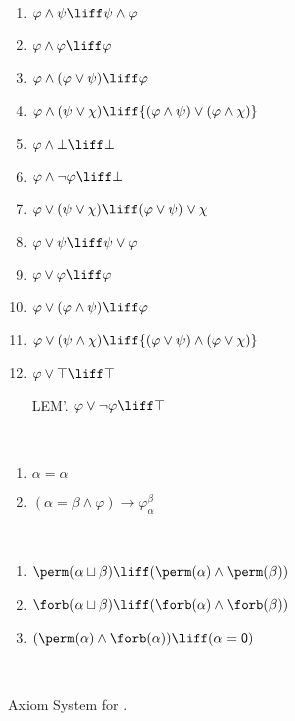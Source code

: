 \begin{figure}
{\begin{minipage}{0.95\textwidth}
\begin{multicols}{2}
\begin{enumerate}[label=A\arabic*'.]
		\item $\varphi \wedge \psi \liff \psi \wedge \varphi$
		\item $\varphi \wedge \varphi \liff \varphi$
		\item $\varphi \wedge (\varphi \vee \psi) \liff \varphi$
		\item ${\varphi \wedge (\psi \vee \chi)} \liff {(\varphi \wedge \psi) \vee (\varphi \wedge \chi)}$
		\item $\varphi \wedge \bot \liff \bot$
		\item $\varphi \wedge \neg \varphi \liff \bot$
		\item $\varphi \vee (\psi \vee \chi) \liff (\varphi \vee \psi) \vee \chi$
		\item $\varphi \vee \psi \liff \psi \vee \varphi$
		\item $\varphi \vee \varphi \liff \varphi$
		\item $\varphi \vee (\varphi \wedge \psi) \liff \varphi$
		\item ${\varphi \vee (\psi \wedge \chi)} \liff {(\varphi \vee \psi) \wedge (\varphi \vee \chi)}$
		\item $\varphi \vee \top \liff \top$
		\item[LEM'.] $\varphi \vee \neg \varphi \liff \top$
	\end{enumerate}
\end{multicols}
		\ \\[-1.5cm]
		\begin{multicols}{2}
			\begin{enumerate}[label=E\arabic*.]
				\item $\alpha = \alpha$
				\item $(\alpha=\beta \land \varphi) \to {\varphi_{\alpha}^{\beta}}$%
			\end{enumerate}
		\end{multicols}
		\ \\[-1.5cm]
		\begin{multicols}{2}
			\begin{enumerate}[label=D\arabic*.]
				\item $\perm(\alpha\sqcup\beta) \liff (\perm(\alpha) \land \perm(\beta))$
				\item $\forb(\alpha\sqcup\beta) \liff (\forb(\alpha) \land \forb(\beta))$
				\item $(\perm(\alpha) \land \forb(\alpha)) \liff (\alpha = \mathsf{0})$
			\end{enumerate}
		\end{multicols}
	\end{minipage}}\\[1em]
	\caption{Axiom System for \DAL.}\label{dal:axioms}
\end{figure}


